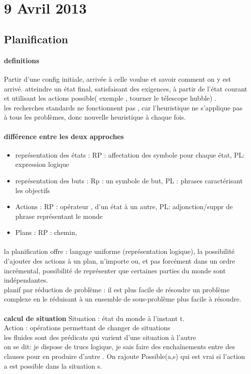 \documentclass{article}
\begin{document}
\section{9 Avril 2013}
\subsection{Planification}
\paragraph{definitions}
 Partir d'une config initiale, arrivée à celle voulue et savoir comment on y est arrivé. atteindre un état final, satisfaisant des exigences, à partir de l'état courant et utilisant les actions possible( exemple , tourner le télescope hubble) .  \\
les recherches standards ne fonctionnent pas , car l'heuristique ne s'applique pas à tous les problèmes, donc nouvelle heuristique à chaque fois.
\paragraph{différence entre les deux approches}
\begin{itemize}
\item représentation des états : RP : affectation des symbole pour chaque état, PL: expression logique
\item représentation des buts : Rp : un symbole de but, PL : phrases caractérisant les objectifs
\item Actions : RP : opérateur , d'un état à un autre, PL: adjonction/suppr de phrase représentant le monde
\item Plans : RP : chemin, 

\end{itemize}
\paragraph{} la planification offre : langage uniforme (représentation logique), la possibilité d'ajouter des actions à un plan, n'importe ou, et pas forcément dans un ordre incrémental, possibilité de représenter que certaines parties du monde sont indépendantes.\\planif par réduction de problème : il est plus facile de résoudre un problème complexe en le réduisant à un ensemble de sous-problème plus facile à résoudre.\\\\
\textbf{calcul de situation} Situation : état du monde à l'instant t.\\Action : opérations permettant de changer de situations\\ les fluides sont des prédicats qui varient d'une situation à l'autre\\ on se dit: je dispose de trucs logique, je sais faire des enchaînements entre des clauses pour en produire d'autre . On rajoute Possible(a,s) qui est vrai si l'action a est possible dans la situation s. 
\end{document}
